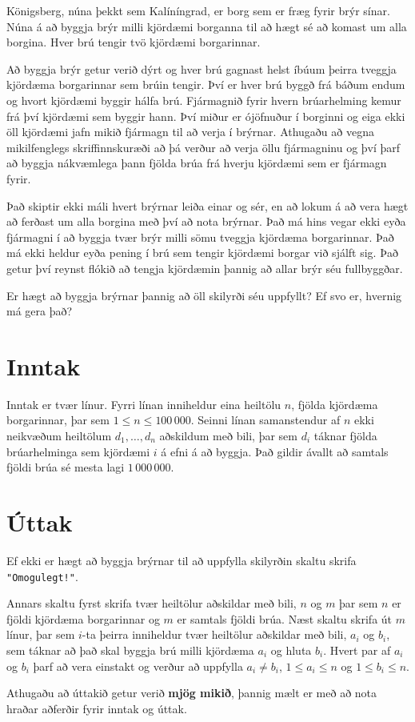 
Königsberg, núna þekkt sem Kalíníngrad, er borg sem er fræg fyrir brýr sínar.
Núna á að byggja brýr milli kjördæmi borganna til að hægt sé að komast um alla borgina.
Hver brú tengir tvö kjördæmi borgarinnar.

Að byggja brýr getur verið dýrt og hver brú gagnast helst íbúum þeirra tveggja kjördæma borgarinnar sem brúin tengir.
Því er hver brú byggð frá báðum endum og hvort kjördæmi byggir hálfa brú.
Fjármagnið fyrir hvern brúarhelming kemur frá því kjördæmi sem byggir hann.
Því miður er ójöfnuður í borginni og eiga ekki öll kjördæmi jafn mikið fjármagn til að verja í brýrnar.
Athugaðu að vegna mikilfenglegs skriffinnskuræði að þá verður að verja öllu fjármagninu og því þarf að byggja nákvæmlega þann fjölda brúa frá hverju kjördæmi sem er fjármagn fyrir.

Það skiptir ekki máli hvert brýrnar leiða einar og sér, en að lokum á að vera hægt að ferðast um alla borgina með því að nota brýrnar.
Það má hins vegar ekki eyða fjármagni í að byggja tvær brýr milli sömu tveggja kjördæma borgarinnar.
Það má ekki heldur eyða pening í brú sem tengir kjördæmi borgar við sjálft sig.
Það getur því reynst flókið að tengja kjördæmin þannig að allar brýr séu fullbyggðar.

Er hægt að byggja brýrnar þannig að öll skilyrði séu uppfyllt?
Ef svo er, hvernig má gera það?

\section*{Inntak}
Inntak er tvær línur.
Fyrri línan inniheldur eina heiltölu $n$, fjölda kjördæma borgarinnar, þar sem $1 \leq n \leq 100\,000$.
Seinni línan samanstendur af $n$ ekki neikvæðum heiltölum $d_1, \dotsc, d_n$ aðskildum með bili,
þar sem $d_i$ táknar fjölda brúarhelminga sem kjördæmi $i$ á efni á að byggja.
Það gildir ávallt að samtals fjöldi brúa sé mesta lagi $1\,000\,000$.

\section*{Úttak}
Ef ekki er hægt að byggja brýrnar til að uppfylla skilyrðin skaltu skrifa \texttt{"Omogulegt!"}.

Annars skaltu fyrst skrifa tvær heiltölur aðskildar með bili, $n$ og $m$ þar sem $n$ er fjöldi kjördæma borgarinnar og $m$ er samtals fjöldi brúa.
Næst skaltu skrifa út $m$ línur, þar sem $i$-ta þeirra inniheldur tvær heiltölur aðskildar með bili, $a_i$ og $b_i$, sem táknar að það skal byggja brú milli kjördæma $a_i$ og hluta $b_i$.
Hvert par af $a_i$ og $b_i$ þarf að vera einstakt og verður að uppfylla $a_i \neq b_i$, $1 \leq a_i \leq n$ og $1 \leq b_i \leq n$.

Athugaðu að úttakið getur verið \textbf{mjög mikið}, þannig mælt er með að nota hraðar aðferðir fyrir inntak og úttak.
